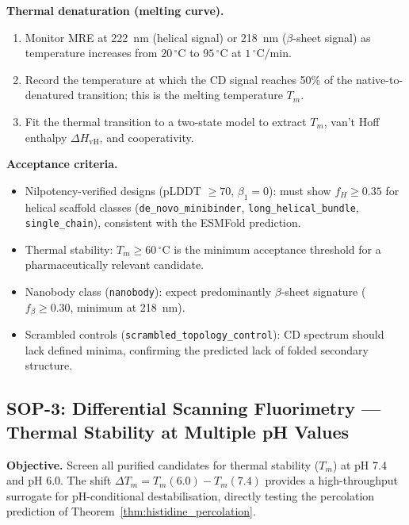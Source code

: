 \noindent\textbf{Thermal denaturation (melting curve).}
\begin{enumerate}[leftmargin=1.5cm, label=\arabic*.]
  \item Monitor MRE at 222~nm (helical signal) or 218~nm ($\beta$-sheet signal)
        as temperature increases from $20\,^\circ\mathrm{C}$ to
        $95\,^\circ\mathrm{C}$ at $1\,^\circ\mathrm{C/min}$.
  \item Record the temperature at which the CD signal reaches 50\% of the
        native-to-denatured transition; this is the melting temperature
        $T_m$.
  \item Fit the thermal transition to a two-state model to extract
        $T_m$, van't Hoff enthalpy $\Delta H_{\text{vH}}$, and cooperativity.
\end{enumerate}

\noindent\textbf{Acceptance criteria.}
\begin{itemize}[leftmargin=1.2cm]
  \item Nilpotency-verified designs (pLDDT $\ge 70$, $\beta_1 = 0$):
        must show $f_H \ge 0.35$ for helical scaffold classes
        (\texttt{de\_novo\_minibinder}, \texttt{long\_helical\_bundle},
        \texttt{single\_chain}), consistent with the ESMFold prediction.
  \item Thermal stability: $T_m \ge 60\,^\circ\mathrm{C}$ is the minimum
        acceptance threshold for a pharmaceutically relevant candidate.
  \item Nanobody class (\texttt{nanobody}): expect predominantly
        $\beta$-sheet signature ($f_\beta \ge 0.30$, minimum at 218~nm).
  \item Scrambled controls (\texttt{scrambled\_topology\_control}): CD spectrum
        should lack defined minima, confirming the predicted lack of folded
        secondary structure.
\end{itemize}

\subsection{SOP-3: Differential Scanning Fluorimetry --- Thermal Stability
            at Multiple pH Values}
\label{subsec:sop3_dsf}

\noindent\textbf{Objective.}  Screen all purified candidates for thermal
stability ($T_m$) at pH 7.4 and pH 6.0.  The shift $\Delta T_m = T_m(6.0) -
T_m(7.4)$ provides a high-throughput surrogate for pH-conditional
destabilisation, directly testing the percolation prediction of
Theorem~\ref{thm:histidine_percolation}.


